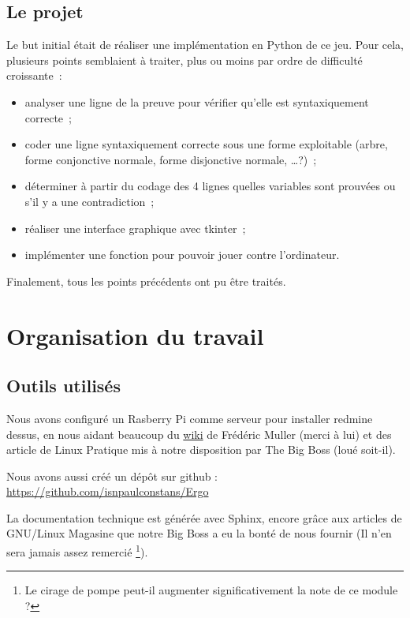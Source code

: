 \documentclass[12pt, algo]{cours}
\begin{document}
\subsection{Le projet}

Le but initial était de réaliser une implémentation en Python de ce jeu. Pour cela, plusieurs points semblaient à traiter, plus ou moins par ordre de difficulté croissante~:
\nopagebreak
\begin{itemize}
\item analyser une ligne de la preuve pour vérifier qu'elle est syntaxiquement correcte~;
\item coder une ligne syntaxiquement correcte sous une forme exploitable (arbre, forme conjonctive normale, forme disjonctive normale, \dots ?)~;
\item déterminer à partir du codage des 4 lignes quelles variables sont prouvées ou s'il y a une contradiction~;
\item réaliser une interface graphique avec tkinter~;
\item implémenter une fonction pour pouvoir jouer contre l'ordinateur.
\end{itemize}

Finalement, tous les points précédents ont pu être traités.



\section{Organisation du travail}

\subsection{Outils utilisés}

Nous avons configuré un Rasberry Pi comme serveur pour installer redmine dessus, en nous aidant beaucoup du \href{http://juramaths.fr/redmine/projects/serveur-web-sur-un-raspberry-pi/wiki}{wiki} de Frédéric Muller (merci à lui) et des article de Linux Pratique mis à notre disposition par The Big Boss (loué soit-il).

Nous avons aussi créé un dépôt sur github : \url{https://github.com/isnpaulconstans/Ergo}

La documentation technique est générée avec Sphinx, encore grâce aux articles de GNU/Linux Magasine que notre Big Boss a eu la bonté de nous fournir (Il n'en sera jamais assez remercié \footnote{Le cirage de pompe peut-il augmenter significativement la note de ce module ?}).
\end{document}
